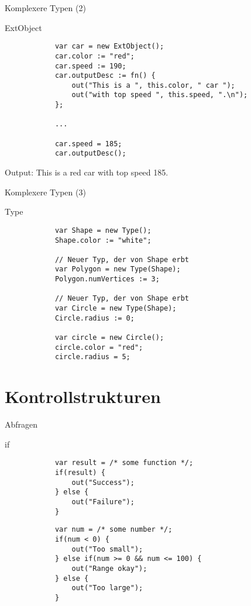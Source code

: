 \documentclass[ucs,9pt]{beamer}
\begin{document}
\begin{frame}[fragile]{Komplexere Typen (2)}
	\begin{block}{ExtObject}
		\begin{lstlisting}
			var car = new ExtObject();
			car.color := "red";
			car.speed := 190;
			car.outputDesc := fn() {
			    out("This is a ", this.color, " car ");
			    out("with top speed ", this.speed, ".\n");
			};

			...

			car.speed = 185;
			car.outputDesc();
		\end{lstlisting}
	\end{block}
	Output: This is a red car with top speed 185.
\end{frame}

\begin{frame}[fragile]{Komplexere Typen (3)}
	\begin{block}{Type}
		\begin{lstlisting}
			var Shape = new Type();
			Shape.color := "white";

			// Neuer Typ, der von Shape erbt
			var Polygon = new Type(Shape); 
			Polygon.numVertices := 3;

			// Neuer Typ, der von Shape erbt
			var Circle = new Type(Shape); 
			Circle.radius := 0;

			var circle = new Circle();
			circle.color = "red";
			circle.radius = 5;
		\end{lstlisting}
	\end{block}
\end{frame}
 
\section{Kontrollstrukturen}
\begin{frame}[fragile]{Abfragen}
	\begin{block}{if}
		\begin{lstlisting}
			var result = /* some function */;
			if(result) {
			    out("Success");
			} else {
			    out("Failure");
			}
		\end{lstlisting}
		\begin{lstlisting}
			var num = /* some number */;
			if(num < 0) {
			    out("Too small");
			} else if(num >= 0 && num <= 100) {
			    out("Range okay");
			} else {
			    out("Too large");
			}
		\end{lstlisting}
	\end{block}
\end{frame}
\end{document}
